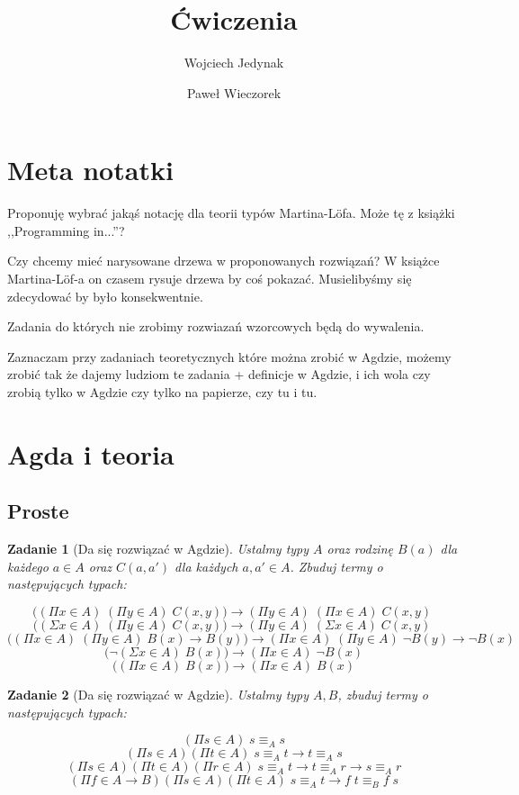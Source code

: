 \documentclass[11pt, a4paper]{article}
\author{Wojciech Jedynak \and Paweł Wieczorek}
\title{Ćwiczenia}
\newtheorem{zadanie}{Zadanie}
\begin{document}
\maketitle

\section*{Meta notatki}

Proponuję wybrać jakąś notację dla teorii typów Martina-L\"{o}fa. Może tę z książki ,,Programming in...''?


Czy chcemy mieć narysowane drzewa w proponowanych rozwiązań? W książce Martina-L\"{o}f-a on czasem rysuje drzewa
by coś pokazać. Musielibyśmy się zdecydować by było konsekwentnie.

Zadania do których nie zrobimy rozwiazań wzorcowych będą do wywalenia.

Zaznaczam przy zadaniach teoretycznych które można zrobić w Agdzie, możemy zrobić tak że dajemy ludziom te zadania
+ definicje w Agdzie, i ich wola czy zrobią tylko w Agdzie czy tylko na papierze, czy tu i tu.

\section{Agda i teoria}


\subsection{Proste}

\begin{zadanie}[Da się rozwiązać w Agdzie]
Ustalmy typy $A$ oraz rodzinę $B(a)$ dla każdego $a \in A$ oraz $C(a, a')$ dla każdych $a, a' \in A$.
Zbuduj termy o następujących typach:

\[
 \big( (\Pi x \in A)\;(\Pi y \in A)\; C(x, y) \big) \to (\Pi y \in A)\;(\Pi x \in A)\; C(x, y)\;
\]
\[
 \big( (\Sigma x \in A)\;(\Pi y \in A)\; C(x, y) \big) \to (\Pi y \in A)\;(\Sigma x \in A)\; C(x, y)\;
\]
\[
 \big( (\Pi x \in A)\;(\Pi y \in A)\;B(x) \to B(y)\big) \to (\Pi x \in A)\;(\Pi y \in A)\;\neg B(y) \to \neg B(x)
\]
\[
 \big( \neg (\Sigma x \in A)\;B(x)\big) \to (\Pi x \in A)\;\neg B(x)
\]
\[
 \big( (\Pi x \in A)\;B(x)\big) \to (\Pi x \in A)\;B(x)
\]
\end{zadanie}


\begin{zadanie}[Da się rozwiązać w Agdzie]
Ustalmy typy $A, B$, zbuduj termy o następujących typach:

\[
 (\Pi s \in A)\; s \equiv_A s
\]
\[
  (\Pi s \in A)(\Pi t \in A)\; s \equiv_A t \to t \equiv_A s
\]
\[
  (\Pi s \in A)(\Pi t \in A)(\Pi r \in A)\; s \equiv_A t \to t \equiv_A r \to s \equiv_A r
\]
\[
  (\Pi f \in A \to B)(\Pi s \in A)(\Pi t \in A)\; s \equiv_A t \to f\;t \equiv_B f\;s
\]

\end{zadanie}
\end{document}
